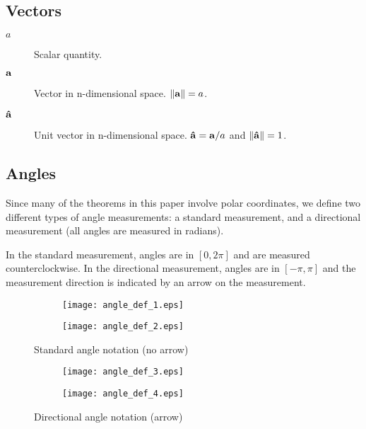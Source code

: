 \subsection{Vectors}

\begin{description}
  \item[$a$] Scalar quantity.
  \item[$\mathbf{a}$] Vector in n-dimensional space. $\norm{\bvec{a}} = a$.
  \item[$\mathbf{\hat{a}}$] Unit vector in n-dimensional space. $\mathbf{\hat{a}} = \mathbf{a}/a$ and $\norm{\bhat{a}} = 1$.
\end{description}

\subsection{Angles}

Since many of the theorems in this paper involve polar coordinates, we define two different types of angle measurements: a standard measurement, and a directional measurement (all angles are measured in radians).

In the standard measurement, angles are in $[0, 2\pi]$ and are measured counterclockwise. In the directional measurement, angles are in $[-\pi, \pi]$ and the measurement direction is indicated by an arrow on the measurement.

\begin{figure}[H]
  \centering
  \begin{subfigure}[b]{0.4\textwidth}
    \texttt{[image: angle\_def\_1.eps]}
    \caption{}
    \label{fig:angle-def-1}
  \end{subfigure}
  \qquad \qquad
  \begin{subfigure}[b]{0.4\textwidth}
    \texttt{[image: angle\_def\_2.eps]}
    \caption{}
    \label{fig:angle-def-2}
  \end{subfigure}
  \caption{Standard angle notation (no arrow)}
\end{figure}

\begin{figure}[H]
  \begin{subfigure}[b]{0.4\textwidth}
    \texttt{[image: angle\_def\_3.eps]}
    \caption{}
    \label{fig:angle-def-3}
  \end{subfigure}
  \qquad \qquad
  \begin{subfigure}[b]{0.4\textwidth}
    \texttt{[image: angle\_def\_4.eps]}
    \caption{}
    \label{fig:angle-def-4}
  \end{subfigure}
  \caption{Directional angle notation (arrow)}
\end{figure}